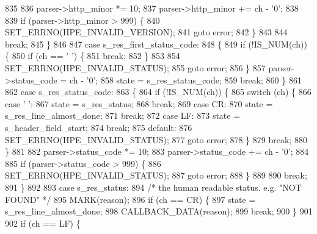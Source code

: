 \begin{DoxyCode}
835 
836         parser->http_minor *= 10;
837         parser->http_minor += ch - \textcolor{charliteral}{'0'};
838 
839         \textcolor{keywordflow}{if} (parser->http_minor > 999) \{
840           SET_ERRNO(HPE_INVALID_VERSION);
841           \textcolor{keywordflow}{goto} error;
842         \}
843 
844         \textcolor{keywordflow}{break};
845       \}
846 
847       \textcolor{keywordflow}{case} s_res_first_status_code:
848       \{
849         \textcolor{keywordflow}{if} (!IS_NUM(ch)) \{
850           \textcolor{keywordflow}{if} (ch == \textcolor{charliteral}{' '}) \{
851             \textcolor{keywordflow}{break};
852           \}
853 
854           SET_ERRNO(HPE_INVALID_STATUS);
855           \textcolor{keywordflow}{goto} error;
856         \}
857         parser->status_code = ch - \textcolor{charliteral}{'0'};
858         state = s_res_status_code;
859         \textcolor{keywordflow}{break};
860       \}
861 
862       \textcolor{keywordflow}{case} s_res_status_code:
863       \{
864         \textcolor{keywordflow}{if} (!IS_NUM(ch)) \{
865           \textcolor{keywordflow}{switch} (ch) \{
866             \textcolor{keywordflow}{case} \textcolor{charliteral}{' '}:
867               state = s_res_status;
868               \textcolor{keywordflow}{break};
869             \textcolor{keywordflow}{case} CR:
870               state = s_res_line_almost_done;
871               \textcolor{keywordflow}{break};
872             \textcolor{keywordflow}{case} LF:
873               state = s_header_field_start;
874               \textcolor{keywordflow}{break};
875             \textcolor{keywordflow}{default}:
876               SET_ERRNO(HPE_INVALID_STATUS);
877               \textcolor{keywordflow}{goto} error;
878           \}
879           \textcolor{keywordflow}{break};
880         \}
881 
882         parser->status_code *= 10;
883         parser->status_code += ch - \textcolor{charliteral}{'0'};
884 
885         \textcolor{keywordflow}{if} (parser->status_code > 999) \{
886           SET_ERRNO(HPE_INVALID_STATUS);
887           \textcolor{keywordflow}{goto} error;
888         \}
889 
890         \textcolor{keywordflow}{break};
891       \}
892 
893       \textcolor{keywordflow}{case} s_res_status:
894         \textcolor{comment}{/* the human readable status. e.g. "NOT FOUND" */}
895         MARK(reason);
896         \textcolor{keywordflow}{if} (ch == CR) \{
897           state = s_res_line_almost_done;
898           CALLBACK_DATA(reason);
899           \textcolor{keywordflow}{break};
900         \}
901 
902         \textcolor{keywordflow}{if} (ch == LF) \{

\end{DoxyCode}
